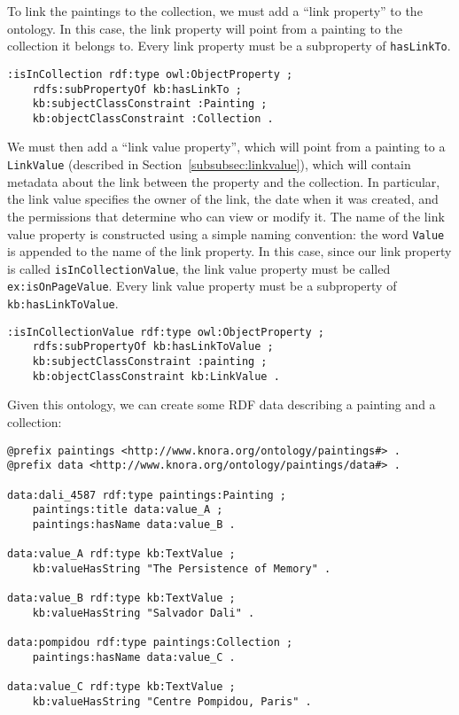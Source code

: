 \documentclass[12pt, a4paper]{article}
\begin{document}
To link the paintings to the collection, we must add a \enquote{link property} to the ontology. In this case, the link property will point from a painting to the collection it belongs to. Every link property must be a subproperty of \texttt{hasLinkTo}.

\begin{verbatim}
:isInCollection rdf:type owl:ObjectProperty ;
    rdfs:subPropertyOf kb:hasLinkTo ;
    kb:subjectClassConstraint :Painting ;
    kb:objectClassConstraint :Collection .
\end{verbatim}

We must then add a \enquote{link value property}, which will point from a painting to a \texttt{LinkValue} (described in Section~\ref{subsubsec:linkvalue}), which will contain metadata about the link between the property and the collection. In particular, the link value specifies the owner of the link, the date when it was created, and the permissions that determine who can view or modify it. The name of the link value property is constructed using a simple naming convention: the word \texttt{Value} is appended to the name of the link property. In this case, since our link property is called \texttt{isInCollectionValue}, the link value property must be called \texttt{ex:isOnPageValue}. Every link value property must be a subproperty of \texttt{kb:hasLinkToValue}.

\begin{verbatim}
:isInCollectionValue rdf:type owl:ObjectProperty ;
    rdfs:subPropertyOf kb:hasLinkToValue ;
    kb:subjectClassConstraint :painting ;
    kb:objectClassConstraint kb:LinkValue .
\end{verbatim}

Given this ontology, we can create some RDF data describing a painting and a collection:

\begin{verbatim}
@prefix paintings <http://www.knora.org/ontology/paintings#> .
@prefix data <http://www.knora.org/ontology/paintings/data#> .

data:dali_4587 rdf:type paintings:Painting ;
    paintings:title data:value_A ;
    paintings:hasName data:value_B .

data:value_A rdf:type kb:TextValue ;
    kb:valueHasString "The Persistence of Memory" .
                
data:value_B rdf:type kb:TextValue ;
    kb:valueHasString "Salvador Dali" .
                
data:pompidou rdf:type paintings:Collection ;
    paintings:hasName data:value_C .
                
data:value_C rdf:type kb:TextValue ;
    kb:valueHasString "Centre Pompidou, Paris" .
\end{verbatim}
\end{document}
